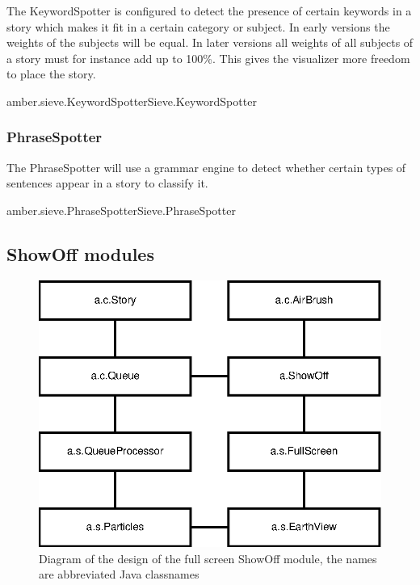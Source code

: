 The KeywordSpotter is configured to detect the presence of certain keywords in
a story which makes it fit in a certain category or subject. In early versions
the weights of the subjects will be equal. In later versions all weights of all
subjects of a story must for instance add up to 100\%. This gives the
visualizer more freedom to place the story.

\begin{module}{amber.sieve.KeywordSpotter}{Sieve.KeywordSpotter}
\end{module}

\subsubsection{PhraseSpotter}

The PhraseSpotter will use a grammar engine to detect whether certain types of
sentences appear in a story to classify it.

\begin{module}{amber.sieve.PhraseSpotter}{Sieve.PhraseSpotter}
\end{module}

\subsection{ShowOff modules}

\begin{figure}
    \centering
    \includegraphics{image/showoff-fullscreen}
    \caption{Diagram of the design of the full screen ShowOff module, the names are abbreviated Java classnames}
\end{figure}

